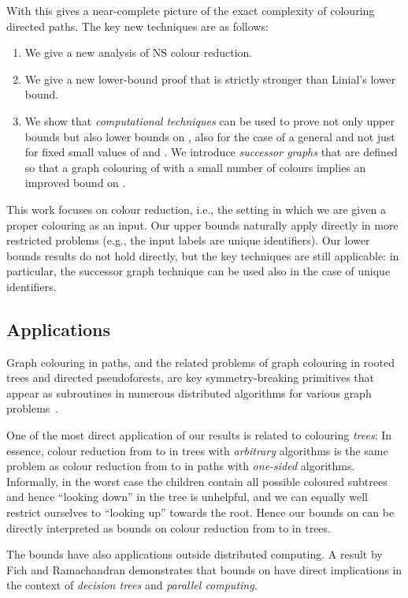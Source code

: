\documentclass[a4paper,11pt]{article}
\theoremstyle{remark}
\begin{document}
With  this gives a near-complete picture of the exact complexity of colouring directed paths. The key new techniques are as follows:
\begin{enumerate}
    \item We give a new analysis of NS colour reduction.
    \item We give a new lower-bound proof that is strictly stronger than Linial's lower bound.
    \item We show that \emph{computational techniques} can be used to prove not only upper bounds but also lower bounds on , also for the case of a general  and not just for fixed small values of  and . We introduce \emph{successor graphs}  that are defined so that a graph colouring of  with a small number of colours implies an improved bound on .
\end{enumerate}
This work focuses on colour reduction, i.e., the setting in which we are given a proper colouring as an input. Our upper bounds naturally apply directly in more restricted problems (e.g., the input labels are unique identifiers). Our lower bounds results do not hold directly, but the key techniques are still applicable: in particular, the successor graph technique can be used also in the case of unique identifiers.


\subsection{Applications}

Graph colouring in paths, and the related problems of graph colouring in rooted trees and directed pseudoforests, are key symmetry-breaking primitives that appear as subroutines in numerous distributed algorithms for various graph problems~\cite{goldberg88parallel,panconesi01some,garay98sublinear,astrand10vc-sc,czygrinow08fast,lenzen14steiner}.

One of the most direct application of our results is related to colouring \emph{trees}: In essence, colour reduction from  to  in trees with \emph{arbitrary} algorithms is the same problem as colour reduction from  to  in paths with \emph{one-sided} algorithms. Informally, in the worst case the children contain all possible coloured subtrees and hence ``looking down'' in the tree is unhelpful, and we can equally well restrict ourselves to ``looking up'' towards the root. Hence our bounds on  can be directly interpreted as bounds on colour reduction from  to  in trees.

The bounds have also applications outside distributed computing. A result by Fich and Ramachandran \cite{fich90linkedlists} demonstrates that bounds on  have direct implications in the context of \emph{decision trees} and \emph{parallel computing}.
\end{document}
